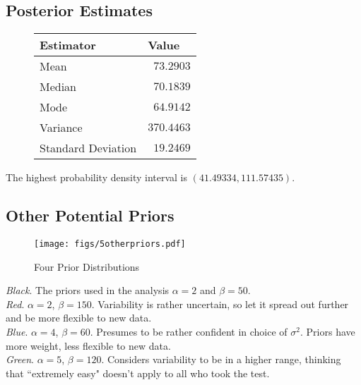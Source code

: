 \documentclass[12pt]{article}
\begin{document}
\subsection{Posterior Estimates}

\begin{figure}[H]
\begin{center}
\begin{tabular}{l|r}
Estimator & \multicolumn{1}{l}{Value} \\ \hline \hline
Mean & $73.2903$ \\
Median & $70.1839$ \\
Mode & $64.9142$ \\
Variance & $370.4463$ \\
Standard Deviation & $19.2469$ \\
\end{tabular}
\end{center}
\end{figure}

The highest probability density interval is $(41.49334, 111.57435)$.

\subsection{Other Potential Priors}

\begin{figure}[H]
\begin{center}
\texttt{[image: figs/5otherpriors.pdf]}
\caption{Four Prior Distributions}
\end{center}
\end{figure}

\noindent \textit{Black}.  The priors used in the analysis $\alpha=2$ and $\beta=50$. \\ [-0.3cm]

\noindent \textit{Red}. $\alpha=2$, $\beta=150$.  Variability is rather uncertain, so let it spread out further and be more flexible to new data. \\ [-0.3cm]

\noindent \textit{Blue}. $\alpha=4$, $\beta=60$.  Presumes to be rather confident in choice of $\sigma^2$.  Priors have more weight, less flexible to new data. \\ [-0.3cm]

\noindent \textit{Green}. $\alpha=5$, $\beta=120$.  Considers variability to be in a higher range, thinking that ``extremely easy" doesn't apply to all who took the test.
\end{document}
